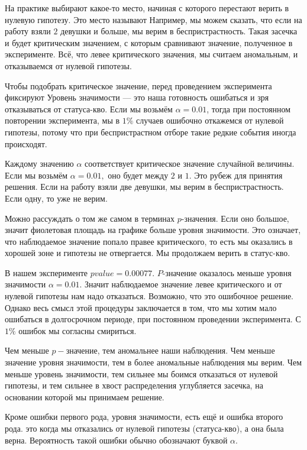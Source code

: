 \documentclass[12pt, a4paper, oneside]{article}
\begin{document}
На практике выбирают какое-то место, начиная с которого перестают верить в нулевую гипотезу. Это место называют  Например, мы можем сказать, что если на работу взяли $2$ девушки и больше, мы верим в беспристрастность. Такая засечка и будет критическим значением, с которым сравнивают значение, полученное в эксперименте. Всё, что левее критического значения, мы считаем аномальным, и отказываемся от нулевой гипотезы. 

Чтобы подобрать критическое значение, перед проведением эксперимента фиксируют  Уровень значимости --- это наша готовность ошибаться и зря отказываться от статуса-кво. Если мы возьмём $\alpha = 0.01$, тогда при постоянном повторении эксперимента, мы в $1\%$ случаев ошибочно откажемся от нулевой гипотезы, потому что при беспристрастном отборе такие редкие события иногда происходят. 

Каждому значению $\alpha$ соответствует критическое значение случайной величины. Если мы возьмём $\alpha = 0.01,$ оно будет между $2$ и $1$. Это рубеж для принятия решения. Если на работу взяли две девушки, мы верим в беспристрастность. Если одну, то уже не верим. 

Можно рассуждать о том же самом в терминах $p$-значения. Если оно большое, значит фиолетовая площадь на графике больше уровня значимости. Это означает, что наблюдаемое значение попало правее критического, то есть мы оказались в хорошей зоне и гипотезы не отвергается. Мы продолжаем верить в статус-кво.

В нашем эксперименте $pvalue = 0.00077.$ $P$-значение оказалось меньше уровня значимости $\alpha=0.01$. Значит наблюдаемое значение левее критического и от нулевой гипотезы нам надо отказаться. Возможно, что это ошибочное решение. Однако весь смысл этой процедуры заключается в том, что мы хотим мало ошибаться в долгосрочном периоде, при постоянном проведении эксперимента. С $1\%$ ошибок мы согласны смириться. 

Чем меньше $p-$значение, тем аномальнее наши наблюдения. Чем меньше значение уровня значимости, тем в более аномальные наблюдения мы верим. Чем меньше уровень значимости, тем сильнее мы боимся отказаться от нулевой гипотезы, и тем сильнее в хвост распределения углубляется засечка, на основании которой мы принимаем решение. 

Кроме ошибки первого рода, уровня значимости, есть ещё и ошибка второго рода.  это когда мы отказались от нулевой гипотезы (статуса-кво), а она была верна. Вероятность такой ошибки обычно обозначают буквой $\alpha$. 
\end{document}
